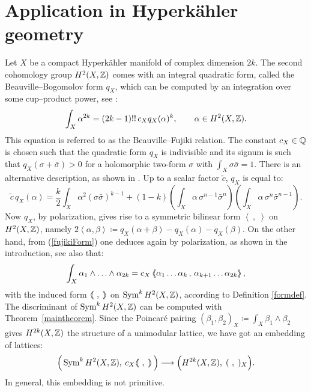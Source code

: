 \section{Application in Hyperk\"ahler geometry} \label{hyper}
Let $X$ be a compact Hyperk\"ahler manifold of complex dimension $2k$. The second cohomology group $H^2(X,\mathbb{Z})$ comes with an integral quadratic form, called the Beauville--Bogomolov form $q_X$, which can be computed by an integration over some cup--product power, see \cite[Subsection~2.3]{OGrady}:
\begin{equation} \label{fujikiForm}
\int_X \alpha ^{2k} = (2k-1)!!\,c_X q_X(\alpha)^k,\qquad \alpha\in H^2(X,\mathbb{Z}).
\end{equation}
This equation is referred to as the Beauville--Fujiki relation. The constant $c_X\in\mathbb{Q}$ is chosen such that the quadratic form $q_X$ is indivisible and its signum is such that $q_X(\sigma + \bar{\sigma}) > 0$ for a holomorphic two-form $\sigma$ with $\int_X\sigma\bar{\sigma} = 1$. There is an alternative description, as shown in \cite[Chap.~23]{Huybrechts}. Up to a scalar factor $\tilde{c}$, $q_X$ is equal to:
\begin{equation}\label{bb}
 \tilde{c}\,q_X(\alpha) = \frac{k}{2}\int_X \alpha^2 (\sigma\bar{\sigma})^{k-1} + (1-k)\left(\int_X\alpha\,\sigma^{n-1}\bar{\sigma}^{n}\right)\left(\int_X\alpha\,\sigma^{n}\bar{\sigma}^{n-1}\right).
\end{equation}
Now $q_X$, by polarization, gives rise to a symmetric bilinear form $\left<\ ,\;\right>$ on $H^2(X,\mathbb{Z})$, namely $2\left<\alpha,\beta\right> \coloneqq q_X(\alpha+\beta)-q_X(\alpha) -q_X(\beta)$. On the other hand, from (\ref{fujikiForm}) one deduces again by polarization, as shown in the introduction, see also \cite[Eq.~3.2.4]{OGrady} that:
\begin{equation}
 \int_X \alpha_1\wedge\ldots\wedge\alpha_{2k} = c_X \left<\!\!\!\:\left< \alpha_1\ldots\alpha_k\,,\,\alpha_{k+1}\ldots\alpha_{2k}\right>\!\!\!\:\right>,
\end{equation}
with the induced form $\left<\!\!\!\:\left<\ ,\;\right>\!\!\!\:\right>$ on $\operatorname{Sym}^kH^2(X,\mathbb{Z})$, according to Definition \ref{formdef}. The discriminant of $\operatorname{Sym}^kH^2(X,\mathbb{Z})$ can be computed with Theorem~\ref{maintheorem}. Since the Poincar\'e pairing $(\beta_1,\beta_2)_X \coloneqq \int_X\beta_1\wedge\beta_2$ gives $H^{2k}(X,\mathbb{Z})$ the structure of a unimodular lattice, we have got an embedding of lattices:
\begin{equation}
\Big( \operatorname{Sym}^kH^2(X,\mathbb{Z}),\: c_X\!\left<\!\!\!\:\left<\ ,\;\right>\!\!\!\:\right>\Big) \longrightarrow \Big(H^{2k}(X,\mathbb{Z}),\;(\ ,\;)_X\Big).
\end{equation}
In general, this embedding is not primitive.

